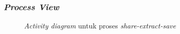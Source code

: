 \subsubsection{\emph{Process View}}
\label{subsubsec:process-view}

\begin{figure}[htbp]
    \centering
    \caption{\emph{Activity diagram} untuk proses \emph{share-extract-save}}
    \label{fig:activity-diagram}
\end{figure}